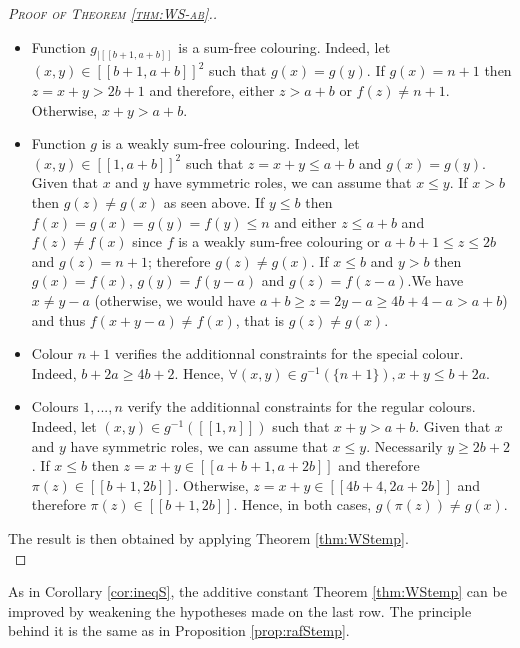 \begin{proof}[\textsc{Proof of Theorem \ref{thm:WS-ab}.}]
\begin{itemize}
\item Function \(g_{|[\![b + 1, a + b]\!]}\) is a sum-free colouring. Indeed, let \((x, y) \in 
	[\![b + 1, a + b]\!]^2\) such that \(g(x) = g(y)\). If \(g(x) = n + 1\) then \(z = x + y > 2 b + 1\) 
	and therefore, either \(z > a + b\) or \(f(z) \neq n + 1\). Otherwise, \(x + y > a + b\).
\item Function \(g\) is a weakly sum-free colouring. Indeed, let \((x, y) \in [\![1, a + b]\!]^2\) such that 
	\(z = x + y \leqslant a + b\) and \(g(x) = g(y)\). Given that \(x\) and \(y\) have symmetric roles, 
	we can assume that \(x \leqslant y\). If \(x > b\) then \(g(z) \neq g(x)\) as seen above. If \(y \leqslant b\) then 
	\(f(x) = g(x) = g(y) = f(y) \leqslant n\) and either \(z \leqslant a + b\) and \(f(z) \neq f(x)\) since \(f\) is a weakly 
	sum-free colouring or \(a + b + 1 \leqslant z \leqslant 2 b\) and \(g(z) = n + 1\); therefore \(g(z) \neq g(x)\). If 
	\(x \leqslant b\) and \(y > b\) then \(g(x) = f(x)\), \(g(y) = f(y - a)\) and \(g(z) = f(z - a)\).We have \(x \neq y - a\) 
	(otherwise, we would have \(a + b \geqslant z = 2 y  - a \geqslant 4 b + 4 - a > a + b\)) and thus \(f(x + y - a) \neq f(x)\),
	that is \(g(z) \neq g(x)\).
\item Colour \(n + 1\) verifies the additionnal constraints for the special colour. Indeed, \(b + 2 a \geqslant 4 b + 2\). 
	Hence, \(\forall (x, y) \in g^{-1}(\{n + 1\}), x + y \leqslant b + 2 a\).
\item Colours \(1, ..., n\) verify the additionnal constraints for the regular colours. Indeed, let 
	\((x, y) \in g^{-1}([\![1, n]\!])\) such that \(x + y > a + b\). Given that \(x\) and \(y\) have symmetric roles, 
	we can assume that \(x \leqslant y\). Necessarily \(y \geqslant 2 b + 2\). If \(x \leqslant b\) then 
	\(z = x + y \in [\![a + b + 1, a + 2 b]\!]\) and therefore \(\pi(z) \in [\![b + 1, 2 b]\!]\). Otherwise, 
	\(z = x + y \in [\![4 b + 4, 2 a + 2 b]\!]\) and therefore \(\pi(z) \in [\![b + 1, 2 b]\!]\). Hence, in both cases, 
	\(g(\pi(z)) \neq g(x)\).
\end{itemize}

The result is then obtained by applying Theorem \ref{thm:WStemp}. \\
\end{proof}

As in Corollary \ref{cor:ineqS}, the additive constant Theorem \ref{thm:WStemp} can be improved 
by weakening the hypotheses made on the last row. The principle behind it is the same as in Proposition \ref{prop:rafStemp}.

